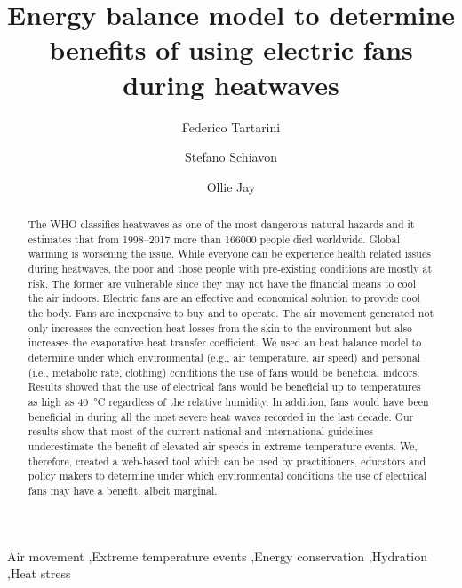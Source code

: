 
\begin{frontmatter}

\title{Energy balance model to determine benefits of using electric fans during heatwaves}

\author[sinBerBest]{Federico Tartarini}
\author[CBE]{Stefano Schiavon}
\author[USYD]{Ollie Jay}

\address[sinBerBest]{SinBerBEST, Berkeley Education Alliance for Research in Singapore, Singapore}
\address[CBE]{Center for the Built Environment, University of California, Berkeley, USA}
\address[USYD]{Sydney School ofHealth Sciences, Faculty ofMedicine and Health, The University ofSydney, Sydney, Australia}

\begin{abstract}
    The WHO classifies heatwaves as one of the most dangerous natural hazards and it estimates that from 1998--2017 more than 166000 people died worldwide.
    Global warming is worsening the issue.
    While everyone can be experience health related issues during heatwaves, the poor and those people with pre-existing conditions are mostly at risk.
    The former are vulnerable since they may not have the financial means to cool the air indoors.
    Electric fans are an effective and economical solution to provide cool the body.
    Fans are inexpensive to buy and to operate.
    The air movement generated not only increases the convection heat losses from the skin to the environment but also increases the evaporative heat transfer coefficient.
    We used an heat balance model to determine under which environmental (e.g., air temperature, air speed) and personal (i.e., metabolic rate, clothing) conditions the use of fans would be beneficial indoors.
    Results showed that the use of electrical fans would be beneficial up to temperatures as high as 40~°C regardless of the relative humidity.
    In addition, fans would have been beneficial in during all the most severe heat waves recorded in the last decade.
    Our results show that most of the current national and international guidelines underestimate the benefit of elevated air speeds in extreme temperature events.
    We, therefore, created a web-based tool which can be used by practitioners, educators and policy makers to determine under which environmental conditions the use of electrical fans may have a benefit, albeit marginal.
\end{abstract}

\begin{keyword}
Air movement \sep Extreme temperature events \sep Energy conservation \sep Hydration \sep Heat stress
\end{keyword}

\end{frontmatter}
